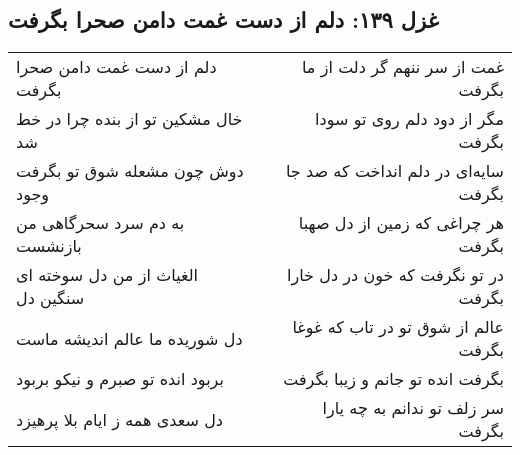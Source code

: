 \begin{center}
\section*{غزل ۱۳۹: دلم از دست غمت دامن صحرا بگرفت}
\label{sec:139}
\begin{longtable}{l p{0.5cm} r}
دلم از دست غمت دامن صحرا بگرفت
&&
غمت از سر ننهم گر دلت از ما بگرفت
\\
خال مشکین تو از بنده چرا در خط شد
&&
مگر از دود دلم روی تو سودا بگرفت
\\
دوش چون مشعله شوق تو بگرفت وجود
&&
سایه‌ای در دلم انداخت که صد جا بگرفت
\\
به دم سرد سحرگاهی من بازنشست
&&
هر چراغی که زمین از دل صهبا بگرفت
\\
الغیاث از من دل سوخته ای سنگین دل
&&
در تو نگرفت که خون در دل خارا بگرفت
\\
دل شوریده ما عالم اندیشه ماست
&&
عالم از شوق تو در تاب که غوغا بگرفت
\\
بربود انده تو صبرم و نیکو بربود
&&
بگرفت انده تو جانم و زیبا بگرفت
\\
دل سعدی همه ز ایام بلا پرهیزد
&&
سر زلف تو ندانم به چه یارا بگرفت
\\
\end{longtable}
\end{center}
